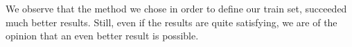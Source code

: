 We observe that the method we chose in order to define our train set, succeeded much better results. Still, even if the results are quite satisfying, we are of the opinion that an even better result is possible.


